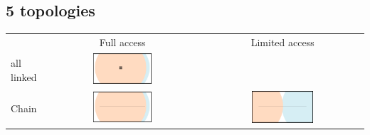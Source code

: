 \documentclass[8pt, handout=show,notes=show]{beamer}
\begin{document}
\subsection{5 topologies}
\begin{frame}


\renewcommand{\imgSize}{0.40\textwidth}
\small
\begin{table}[h]
\centering
\begin{tabular}{lcc}
&Full access&Limited access\\
all linked&\includegraphics[width=\imgSize]{../images/5StaticEnv/environments/staticEnv0}&\\
Chain&\includegraphics[width=\imgSize]{../images/5StaticEnv/environments/staticEnv1}&\includegraphics[width=\imgSize]{../images/5StaticEnv/environments/staticEnv2}\\

\end{tabular}
\end{table}
\end{frame}
\end{document}
